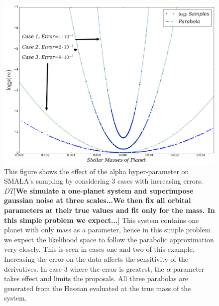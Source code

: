 \documentclass{aa}
\def\memodt#1{\color{green}$DT[${\bf #1}$]$ \color{black}}
\begin{document}
\begin{figure}
\centering
\includegraphics[width=0.95\hsize]{alpha-1.png}
   \caption{This figure shows the effect of the alpha hyper-parameter on SMALA's sampling by considering 3 cases with increasing errors. 
\memodt{We simulate a one-planet system and superimpose gaussian noise at three scales...We then fix all orbital parameters at their true values and fit only for the mass. In this simple problem we expect...}
This system contains one planet with only mass as a parameter, hence in this simple problem we expect the likelihood space to follow the parabolic approximation very closely. 
This is seen in cases one and two of this example. 
Increasing the error on the data affects the sensitivity of the derivatives.
In case 3 where the error is greatest, the $\alpha$ parameter takes effect and limits the proposals. 
All three parabolas are generated from the Hessian evaluated at the true mass of the system.}
      \label{alpha}
\end{figure}
\end{document}
